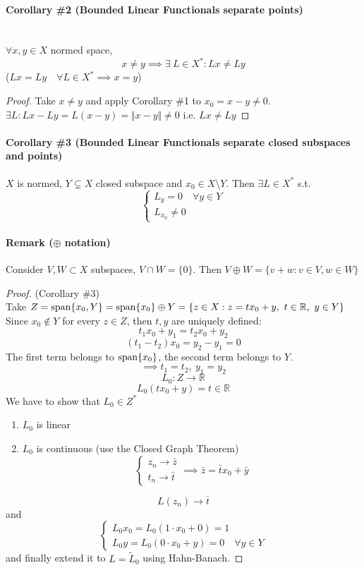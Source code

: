 \paragraph{Corollary \#2 (Bounded Linear Functionals separate points)}\ \\
$\forall x,y\in X$ normed space,
$$x\neq y\implies \exists\ L\in X^*:Lx\neq Ly$$
($Lx=Ly\quad \forall L\in X^*\implies x=y$)
\begin{proof}
    Take $x\neq y$ and apply Corollary \#1 to $x_0=x-y\neq 0$.\\
    $\exists L: Lx-Ly=L(x-y)=\Vert x-y\Vert \neq 0$ i.e. $Lx\neq Ly$
\end{proof}
\paragraph{Corollary \#3 (Bounded Linear Functionals separate closed subspaces and points)}
$X$ is normed, $Y\subsetneq X$ closed subspace and 
$x_0\in X\setminus Y$. Then $\exists L\in X^*$ s.t. $$\begin{cases}
    L_y=0 \quad \forall y \in Y\\ L_{x_0}\neq 0
\end{cases}$$
\paragraph{Remark ($\oplus$ notation)}
Consider $V,W\subset X$ subspaces, $V\cap W=\{ 0\}$. Then $V\oplus W=\{ v+w:v\in V, w\in W\}$
\begin{proof} (Corollary \#3)\\
    Take $Z=\mathrm{span}\{x_0,Y\}=\mathrm{span}\{ x_0\} \oplus Y = \{ z\in X:z=tx_0+y,\ t\in \mathbb R, \ y\in Y\}$\\
    Since $x_0\notin Y$ for every $z\in Z$, then $t,y$ are uniquely defined:
    $$t_1x_0+y_1=t_2x_0+y_2$$
    $$(t_1-t_2)x_0=y_2-y_1=0$$
    The first term belongs to $\mathrm{span}\{x_0\}$, the second term belongs to $Y$.
    $$\implies t_1=t_2,\ y_1=y_2$$
    $$L_0:Z\to \mathbb R$$
    $$L_0( tx_0+y)= t\in \mathbb R$$
    We have to show that $L_0\in Z^*$
    \begin{enumerate}
        \item $L_0$ is linear
        \item $L_0$ is continuous (use the Closed Graph Theorem)
        $$\begin{cases}
            z_n\to \bar z\\ t_n\to \bar t
        \end{cases}\implies \bar z= \bar t x_0+\bar y$$
        
    \end{enumerate}
    $$ L(z_n)\to \bar t$$
    and $$\begin{cases}
        L_0x_0=L_0(1\cdot x_0+0)=1\\ L_0 y=L_0(0\cdot x_0+y)=0\quad \forall y\in Y
    \end{cases}$$
    and finally extend it to $L=\tilde L_0$ using Hahn-Banach.
\end{proof}
